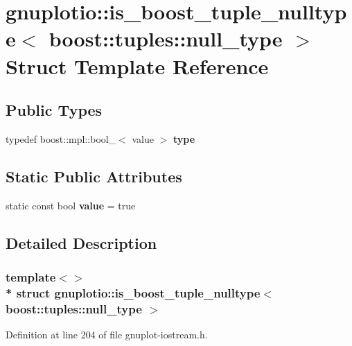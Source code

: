 \hypertarget{structgnuplotio_1_1is__boost__tuple__nulltype_3_01boost_1_1tuples_1_1null__type_01_4}{}\section{gnuplotio\+:\+:is\+\_\+boost\+\_\+tuple\+\_\+nulltype$<$ boost\+:\+:tuples\+:\+:null\+\_\+type $>$ Struct Template Reference}
\label{structgnuplotio_1_1is__boost__tuple__nulltype_3_01boost_1_1tuples_1_1null__type_01_4}
\subsection*{Public Types}
\begin{DoxyCompactItemize}
\item 
typedef boost\+::mpl\+::bool\+\_\+$<$ value $>$ {\bfseries type}\hypertarget{structgnuplotio_1_1is__boost__tuple__nulltype_3_01boost_1_1tuples_1_1null__type_01_4_aab5c47dbae2148f1e9ed4d89f25f21fd}{}\label{structgnuplotio_1_1is__boost__tuple__nulltype_3_01boost_1_1tuples_1_1null__type_01_4_aab5c47dbae2148f1e9ed4d89f25f21fd}

\end{DoxyCompactItemize}
\subsection*{Static Public Attributes}
\begin{DoxyCompactItemize}
\item 
static const bool {\bfseries value} = true\hypertarget{structgnuplotio_1_1is__boost__tuple__nulltype_3_01boost_1_1tuples_1_1null__type_01_4_ae7fc5c63a7b01851c7ce12dbf634cfea}{}\label{structgnuplotio_1_1is__boost__tuple__nulltype_3_01boost_1_1tuples_1_1null__type_01_4_ae7fc5c63a7b01851c7ce12dbf634cfea}

\end{DoxyCompactItemize}


\subsection{Detailed Description}
\subsubsection*{template$<$$>$\\*
struct gnuplotio\+::is\+\_\+boost\+\_\+tuple\+\_\+nulltype$<$ boost\+::tuples\+::null\+\_\+type $>$}



Definition at line 204 of file gnuplot-\/iostream.\+h.


